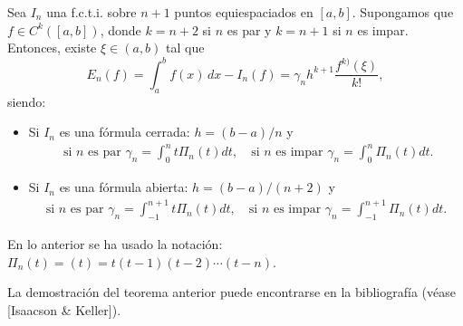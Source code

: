 \begin{theorem}
  \label{thm:error.formulas-nc}
  Sea $I_n$ una f.c.t.i. sobre $n+1$ puntos equiespaciados en
  $[a,b]$. Supongamos que $f\in C^k([a,b])$, donde $k=n+2$ si $n$ es par
  y $k=n+1$ si $n$ es impar. Entonces, existe $\xi\in(a,b)$ tal que
  \begin{equation}
  \label{eq:error-formulas-nc} 
  E_n(f)=\int_a^bf(x)\,dx - I_n(f)
    = \gamma_n h^{k+1} \frac{f^{k)}(\xi)}{k!},
  \end{equation}
  siendo:
  \begin{itemize}
  \item Si $I_n$ es una fórmula cerrada: $h=(b-a)/n$ y
    \begin{align*}
      \text{ si $n$ es par }
      \gamma_n=\int_0^n t \Pi_n(t) dt,
      \quad \text{si $n$ es impar }
          \gamma_n=\int_0^n \Pi_n(t) dt.
    \end{align*}
  \item Si $I_n$ es una fórmula abierta: $h=(b-a)/(n+2)$ y
    \begin{align*}
      \text{si $n$ es par }
      \gamma_n=\int_{-1}^{n+1} t \Pi_n(t) dt,
      \quad \text{si $n$ es impar }
      \gamma_n=\int_{-1}^{n+1} \Pi_n(t) dt.
    \end{align*}
  \end{itemize}
  En lo anterior se ha usado la notación:
  $\Pi_n(t)=(t)=t(t-1)(t-2)\cdots (t-n)$.
\end{theorem}

La demostración del teorema anterior puede encontrarse en la
bibliografía (véase [Isaacson \& Keller]).

